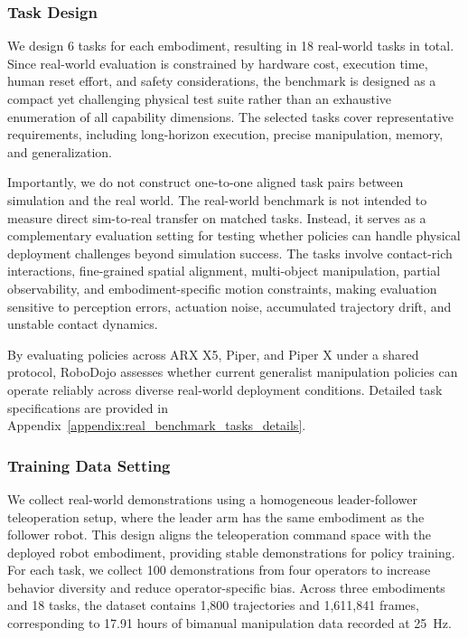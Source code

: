 \subsubsection{Task Design}

We design 6 tasks for each embodiment, resulting in 18 real-world tasks in total. Since real-world evaluation is constrained by hardware cost, execution time, human reset effort, and safety considerations, the benchmark is designed as a compact yet challenging physical test suite rather than an exhaustive enumeration of all capability dimensions. The selected tasks cover representative requirements, including long-horizon execution, precise manipulation, memory, and generalization.

Importantly, we do not construct one-to-one aligned task pairs between simulation and the real world. The real-world benchmark is not intended to measure direct sim-to-real transfer on matched tasks. Instead, it serves as a complementary evaluation setting for testing whether policies can handle physical deployment challenges beyond simulation success. The tasks involve contact-rich interactions, fine-grained spatial alignment, multi-object manipulation, partial observability, and embodiment-specific motion constraints, making evaluation sensitive to perception errors, actuation noise, accumulated trajectory drift, and unstable contact dynamics.

By evaluating policies across ARX X5, Piper, and Piper X under a shared protocol, RoboDojo assesses whether current generalist manipulation policies can operate reliably across diverse real-world deployment conditions. Detailed task specifications are provided in Appendix~\ref{appendix:real_benchmark_tasks_details}.

\subsubsection{Training Data Setting}

We collect real-world demonstrations using a homogeneous leader-follower teleoperation setup, where the leader arm has the same embodiment as the follower robot. This design aligns the teleoperation command space with the deployed robot embodiment, providing stable demonstrations for policy training. For each task, we collect 100 demonstrations from four operators to increase behavior diversity and reduce operator-specific bias. Across three embodiments and 18 tasks, the dataset contains 1,800 trajectories and 1,611,841 frames, corresponding to 17.91 hours of bimanual manipulation data recorded at 25~Hz.

